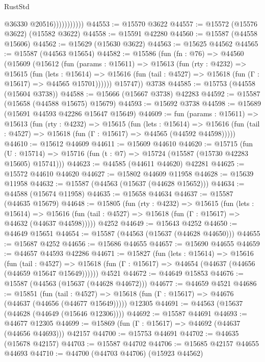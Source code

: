 \begin{lexlean}{RustStd}
\begin{coremodule}
                          @36330
                          @20516)))))))))))
@44553 := @15570 @3622
@44557 := @15572 (@15576 @3622) (@15582 @3622)
@44558 := @15591 @42280
@44560 := @15587 (@44558 @15606)
@44562 := @15629 (@15630 @3622)
@44563 := @15625 @44562
@44565 := @15587 (@44563 @15654)
@44582 := @15586
    (fun (fn : @76) =>
    @44560
      (@15609
        (@15612
          (fun (params : @15611) =>
          @15613
            (fun (rty : @4232) =>
            @15615
              (fun (lets : @15614) =>
              @15616 (fun (tail : @4527) => @15618 (fun (Γ : @15617) => @44565 @15701))))))
        @15747))
    @3738
@44585 := @15753 (@44558 (@15604 @3738))
@44588 := @15666 (@15667 @3738) @42283
@44592 := @15587 (@15658 (@44588 @15675) @15679)
@44593 := @15692 @3738
@44598 := @15689 (@15691 @44593 @42286 @15647 @15649)
@44609 := fun (params : @15611) =>
  @15613
    (fun (rty : @4232) =>
    @15615
      (fun (lets : @15614) =>
      @15616 (fun (tail : @4527) => @15618 (fun (Γ : @15617) => @44565 (@44592 @44598)))))
@44610 := @15612 @44609
@44611 := @15609 @44610
@44620 := @15715
    (fun (U : @15714) => @15716 (fun (t : @7) => @15724 (@15587 (@15730 @42283 @15605) @15741)))
@44623 := @44585 (@44611 @44620) @42281
@44625 := @15572 @44610 @44620
@44627 := @15802 @44609 @11958
@44628 := @15639 @11958
@44632 := @15587 (@44563 (@15637 (@44628 @15652)))
@44634 := @44588 (@15674 @11958)
@44635 := @15658 @44634
@44637 := @15587 (@44635 @15679)
@44648 := @15805
    (fun (rty : @4232) =>
    @15615
      (fun (lets : @15614) =>
      @15616 (fun (tail : @4527) => @15618 (fun (Γ : @15617) => @44632 (@44637 @44598)))))
    @4252
@44649 := @15643 @4252
@44650 := @44649 @15651
@44654 := @15587 (@44563 (@15637 (@44628 @44650)))
@44655 := @15687 @4252
@44656 := @15686 @44655
@44657 := @15690 @44655
@44659 := @44657 @44593 @42286
@44671 := @15827
    (fun (lets : @15614) =>
    @15616
      (fun (tail : @4527) =>
      @15618 (fun (Γ : @15617) => @44654 (@44637 (@44656 (@44659 @15647 @15649))))))
    @4521
@44672 := @44649 @15853
@44676 := @15587 (@44563 (@15637 (@44628 @44672)))
@44677 := @44659 @4521
@44686 := @15851
    (fun (tail : @4527) => @15618 (fun (Γ : @15617) => @44676 (@44637 (@44656 (@44677 @15649)))))
    @12305
@44691 := @44563 (@15637 (@44628 (@44649 (@15646 @12306))))
@44692 := @15587 @44691
@44693 := @44677 @12305
@44699 := @15869 (fun (Γ : @15617) => @44692 (@44637 (@44656 @44693))) @42157
@44700 := @15753 @44691
@44702 := @44635 (@15678 @42157)
@44703 := @15587 @44702
@44706 := @15685 @42157 @44655 @44693
@44710 := @44700 (@44703 @44706) (@15923 @44562)

\end{coremodule}
\end{lexlean}
